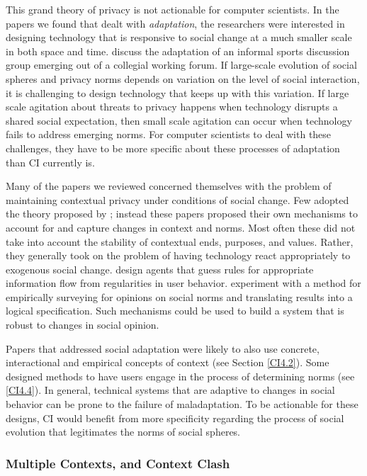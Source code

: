 \documentclass[../thesis.tex]{subfiles}
\begin{document}
This grand theory of privacy is not actionable for computer scientists.
In the papers we found that dealt with \textit{adaptation}, the
researchers were interested in designing technology that is responsive
to social change at a much smaller scale in both space and time.
\citet{criado2015implicit} discuss the adaptation of an
informal sports discussion
group emerging out of a collegial working forum. If large-scale
evolution of social spheres and privacy norms depends on variation on
the level of social interaction, it is challenging to design technology
that keeps up with this variation. If large scale agitation about
threats to privacy happens when technology disrupts a shared social
expectation, then small scale agitation can occur when technology fails
to address emerging norms. For computer scientists to deal with these
challenges, they have to be more specific about these processes of
adaptation than CI currently is.

Many of the papers we reviewed concerned themselves with the problem of
maintaining contextual privacy under conditions of social change. Few
adopted the theory proposed by \citet{nissenbaum09book}; instead these papers
proposed their own mechanisms to account for and capture changes in
context and norms. Most often these did not take into account the
stability of contextual ends, purposes, and values. Rather, they
generally took on the problem of having technology react appropriately
to exogenous social change. \citet{criado2015implicit}
design agents that
guess rules for appropriate information flow from regularities in user
behavior. \citet{shvartzshnaider2016learning} experiment with a method for
empirically surveying for opinions on social norms and translating
results into a logical specification. Such mechanisms could be used to
build a system that is robust to changes in social opinion.

Papers that addressed social adaptation were likely to also use
concrete, interactional and empirical concepts of context (see Section
\ref{CI4.2}). Some designed methods to have users engage in the process of
determining norms (see \ref{CI4.4}). In general, technical systems that are
adaptive to changes in social behavior can be prone to the failure of
maladaptation. To be actionable for these designs, CI would benefit
from more specificity regarding the process of social evolution that
legitimates the norms of social spheres.

\subsubsection{Multiple Contexts, and Context Clash}
\label{CI4.4.2}
\end{document}
